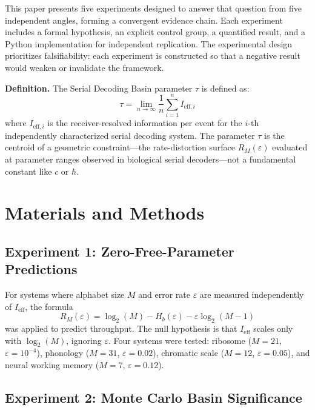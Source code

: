 \documentclass[12pt,a4paper]{article}
\begin{document}
This paper presents five experiments designed to answer that question from five independent angles, forming a convergent evidence chain. Each experiment includes a formal hypothesis, an explicit control group, a quantified result, and a Python implementation for independent replication. The experimental design prioritizes falsifiability: each experiment is constructed so that a negative result would weaken or invalidate the framework.

\textbf{Definition.} The Serial Decoding Basin parameter $\tau$ is defined as:
\begin{equation}
\tau = \lim_{n \to \infty} \frac{1}{n} \sum_{i=1}^{n} I_{\mathrm{eff},i}
\end{equation}
where $I_{\mathrm{eff},i}$ is the receiver-resolved information per event for the $i$-th independently characterized serial decoding system. The parameter $\tau$ is the centroid of a geometric constraint---the rate-distortion surface $R_M(\varepsilon)$ evaluated at parameter ranges observed in biological serial decoders---not a fundamental constant like $c$ or $\hbar$.

\section{Materials and Methods}

\subsection{Experiment 1: Zero-Free-Parameter Predictions}

For systems where alphabet size $M$ and error rate $\varepsilon$ are measured independently of $I_{\mathrm{eff}}$, the formula
\begin{equation}
R_M(\varepsilon) = \log_2(M) - H_b(\varepsilon) - \varepsilon \log_2(M - 1)
\end{equation}
was applied to predict throughput. The null hypothesis is that $I_{\mathrm{eff}}$ scales only with $\log_2(M)$, ignoring $\varepsilon$. Four systems were tested: ribosome ($M = 21$, $\varepsilon = 10^{-4}$), phonology ($M = 31$, $\varepsilon = 0.02$), chromatic scale ($M = 12$, $\varepsilon = 0.05$), and neural working memory ($M = 7$, $\varepsilon = 0.12$).

\subsection{Experiment 2: Monte Carlo Basin Significance}
\end{document}
